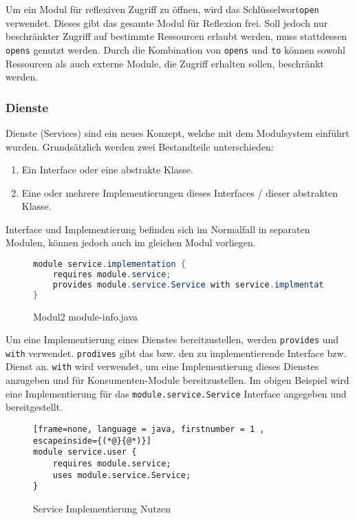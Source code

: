 Um ein Modul für reflexiven Zugriff zu öffnen, wird das Schlüsselwort\texttt{open} verwendet.
Dieses gibt das gesamte Modul für Reflexion frei.
Soll jedoch nur beschränkter Zugriff auf bestimmte Ressourcen erlaubt werden, muss stattdessen \texttt{opens} genutzt werden.
Durch die Kombination von \texttt{opens} und \texttt{to} können sowohl Ressourcen als auch externe Module, die Zugriff erhalten sollen, beschränkt werden.


\subsubsection{Dienste}
Dienste (Services) sind ein neues Konzept, welche mit dem Modulsystem einführt wurden.
Grundsätzlich werden zwei Bestandteile unterschieden:

\begin{enumerate}[noitemsep]
	\item Ein Interface oder eine abstrakte Klasse.
	\item Eine oder mehrere Implementierungen dieses Interfaces / dieser abstrakten Klasse. 
\end{enumerate}

Interface und Implementierung befinden sich im Normalfall in separaten Modulen, können jedoch auch im gleichen Modul vorliegen.


\begin{figure}[hbt!]
\begin{lstlisting}[frame=none, language = java, firstnumber = 1 ,]
module service.implementation {
	requires module.service;
	provides module.service.Service with service.implmentation.MyImplementation;
}
\end{lstlisting}
\caption{Modul2 module-info.java}
\label{fig:module2-info}
\end{figure}


Um eine Implementierung eines Dienstes bereitzustellen, werden \texttt{provides} und \texttt{with} verwendet.
\texttt{prodives} gibt das bzw. den zu implementierende Interface bzw. Dienst an. 
\texttt{with} wird verwendet, um eine Implementierung dieses Dienstes anzugeben und für Konsumenten-Module bereitzustellen. 
Im obigen Beispiel wird eine Implementierung für das \texttt{module.service.Service} Interface angegeben und bereitgestellt.


\begin{figure}[hbt!]
\begin{lstlisting}[frame=none, language = java, firstnumber = 1 , escapeinside={(*@}{@*)}]
module service.user {
	requires module.service;
	uses module.service.Service;
}
\end{lstlisting}
\caption{Service Implementierung Nutzen}
\label{fig:service-use}
\end{figure}


